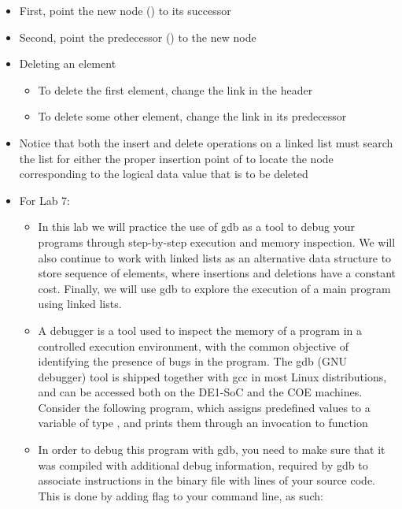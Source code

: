 \begin{itemize}
\begin{itemize}
      \item First, point the new node () to its successor

      \item Second, point the predecessor () to the new node

      \item Deleting an element

        \begin{itemize}

          \item To delete the first element, change the link in the header

          \item To delete some other element, change the link in its predecessor

        \end{itemize}

      \item Notice that both the insert and delete operations on a linked list must search the list for either the proper insertion point of to locate the node corresponding to the logical data value that is to be deleted

      \item For Lab 7:

        \begin{itemize}

          \item In this lab we will practice the use of gdb as a tool to debug your programs through step-by-step execution and memory inspection. We will also continue to work with linked lists as an alternative data structure to store sequence of elements, where insertions and deletions have a constant cost. Finally, we will use gdb to explore the execution of a main program using linked lists.

          \item A debugger is a tool used to inspect the memory of a program in a controlled execution environment, with the common objective of identifying the presence of bugs in the program. The gdb (GNU debugger) tool is shipped together with gcc in most Linux distributions, and can be accessed both on the DE1-SoC and the COE machines. Consider the following program, which assigns predefined values to a variable of type , and prints them through an invocation to function 

          \item In order to debug this program with gdb, you need to make sure that it was compiled with additional debug information, required by gdb to associate instructions in the binary file with lines of your source code. This is done by adding flag  to your  command line, as such:


\end{itemize}
\end{itemize}
\end{itemize}
